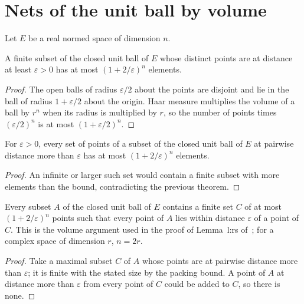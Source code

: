 \section{Nets of the unit ball by volume}

Let $E$ be a real normed space of dimension $n$.

\begin{theorem}
    \label{thm:ball_separated_card}
    \leanok
    A finite subset of the closed unit ball of $E$ whose distinct points are
    at distance at least $\varepsilon>0$ has at most $(1+2/\varepsilon)^n$
    elements.
\end{theorem}

\begin{proof}
    \leanok
    The open balls of radius $\varepsilon/2$ about the points are disjoint
    and lie in the ball of radius $1+\varepsilon/2$ about the origin. Haar
    measure multiplies the volume of a ball by $r^n$ when its radius is
    multiplied by $r$, so the number of points times $(\varepsilon/2)^n$ is
    at most $(1+\varepsilon/2)^n$.
\end{proof}

\begin{theorem}
    \label{thm:ball_packing}
    \leanok
    For $\varepsilon>0$, every set of points of a subset of the closed unit
    ball of $E$ at pairwise distance more than $\varepsilon$ has at most
    $(1+2/\varepsilon)^n$ elements.
\end{theorem}

\begin{proof}
    \leanok
    An infinite or larger such set would contain a finite subset with more
    elements than the bound, contradicting the previous theorem.
\end{proof}

\begin{theorem}
    \label{thm:ball_net}
    \leanok
    Every subset $A$ of the closed unit ball of $E$ contains a finite set $C$
    of at most $(1+2/\varepsilon)^n$ points such that every point of $A$ lies
    within distance $\varepsilon$ of a point of $C$. This is the volume
    argument used in the proof of Lemma~l:rs
    of~\cite[lines 541--546]{Arad2016RigorousRG}; for a complex space of
    dimension $r$, $n=2r$.
\end{theorem}

\begin{proof}
    \leanok
    Take a maximal subset $C$ of $A$ whose points are at pairwise distance
    more than $\varepsilon$; it is finite with the stated size by the packing
    bound. A point of $A$ at distance more than $\varepsilon$ from every point
    of $C$ could be added to $C$, so there is none.
\end{proof}
